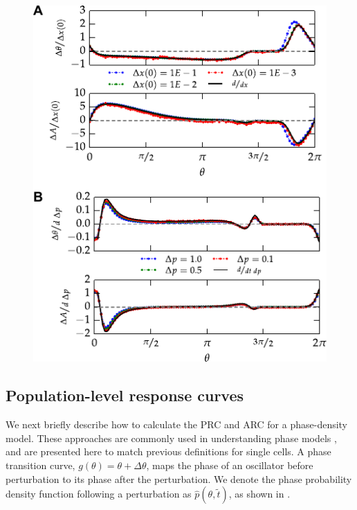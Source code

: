 \begin{figure}[tbp]
  \centering
  \includegraphics[width=.75\textwidth]{chap5/figures/figure_S1.pdf}
  \label{fig:5s1}
\end{figure}


\subsection{Population-level response curves}

We next briefly describe how to calculate the PRC and ARC for a phase-density model.
These approaches are commonly used in understanding phase models \cite{Kuramoto1984, Ukai2007}, and are presented here to match previous definitions for single cells. 
A phase transition curve, $g(\theta) = \theta + \Delta\theta$, maps the phase of an oscillator before perturbation to its phase after the perturbation.
We denote the phase probability density function following a perturbation as $\hat{p}(\theta, \tilde{t})$, as shown in .

